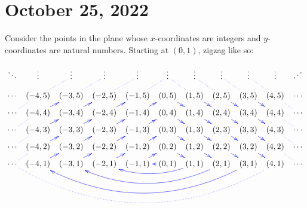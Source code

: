 \documentclass[12pt]{amsart}
\numberwithin{equation}{section}
\theoremstyle{plain} %
\newcommand{\Oct}[1]{\section{October #1, 2022}}
\theoremstyle{definition}
\theoremstyle{remark}
\begin{document}
\newpage
\Oct{25}

Consider the points in the plane whose $x$-coordinates are integers and $y$-coordinates are natural numbers. Starting at $(0,1)$, zigzag like so:


	\vspace{-1.5em}
{\tiny
\begin{center}
\[{\xymatrix@C=.5em@R=.5em{ 
\ddots & \vdots & \vdots &  \vdots & \vdots & \vdots \ar@{.}@[blue][dr]& \vdots \ar@{.}@[blue][dr]& \vdots \ar@{.}@[blue][dr]& \vdots \ar@{.}@[blue][dr]&  \vdots & \reflectbox{$\ddots$} \\
\cdots & (-4,5) \ar@{.}@[blue][ur]& (-3,5) \ar@{.}@[blue][ur]& (-2,5) \ar@{.}@[blue][ur]& (-1,5) \ar@{.}@[blue][ur]& (0,5) \ar@{->}@[blue][dr]
& (1,5) \ar@{->}@[blue][dr]& (2,5) \ar@{->}@[blue][dr]& (3,5) \ar@{->}@[blue][dr]& (4,5)\ar@{.}@[blue][dr] & \cdots \\
\cdots \ar@{.}@[blue][ur]& (-4,4) \ar@{->}@[blue][ur]& (-3,4) \ar@{->}@[blue][ur]& (-2,4) \ar@{->}@[blue][ur]& (-1,4) \ar@{->}@[blue][ur]& (0,4) \ar@{->}@[blue][dr]
& (1,4) \ar@{->}@[blue][dr]& (2,4) \ar@{->}@[blue][dr]& (3,4) \ar@{->}@[blue][dr]& (4,4) \ar@{.}@[blue][dr]& \cdots \\
\cdots \ar@{.}@[blue][ur]& (-4,3) \ar@{->}@[blue][ur]& (-3,3) \ar@{->}@[blue][ur]& (-2,3) \ar@{->}@[blue][ur]& (-1,3) \ar@{->}@[blue][ur]& (0,3) \ar@{->}@[blue][dr]
& (1,3) \ar@{->}@[blue][dr]& (2,3) \ar@{->}@[blue][dr]& (3,3) \ar@{->}@[blue][dr]& (4,3) \ar@{.}@[blue][dr]& \cdots \\
\cdots \ar@{.}@[blue][ur]& (-4,2) \ar@{->}@[blue][ur]& (-3,2) \ar@{->}@[blue][ur]& (-2,2) \ar@{->}@[blue][ur]& (-1,2) \ar@{->}@[blue][ur] & (0,2) \ar@{->}@[blue][dr]
& (1,2) \ar@{->}@[blue][dr] & (2,2) \ar@{->}@[blue][dr]& (3,2) \ar@{->}@[blue][dr]& (4,2) \ar@{.}@[blue][dr]& \cdots \\
\cdots \ar@{.}@[blue][ur] & (-4,1) \ar@{->}@[blue][ur]& (-3,1) \ar@{->}@[blue][ur] & (-2,1) \ar@{->}@[blue][ur]& (-1,1) \ar@{->}@[blue][ur]& (0,1) \ar@{->}@[blue][l]
& (1,1) \ar@/^1pc/@[blue][lll]& (2,1) \ar@/^2pc/@[blue][lllll] & (3,1) \ar@/^3pc/@[blue][lllllll] & (4,1)  \ar@{.}@/^4pc/@[blue][lllllllll]& \cdots \\
 }}\]
 \end{center}
 }
 \
 
 \
 
 \
 
 \
 
\end{document}
